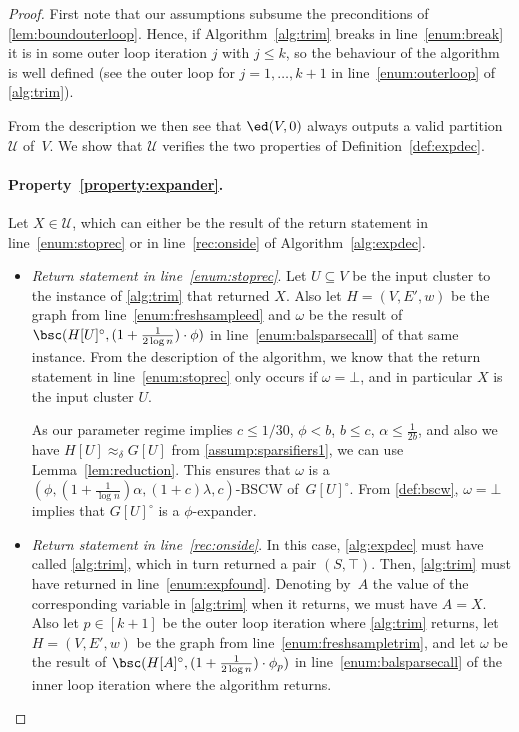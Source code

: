 \begin{proof}
	First note that our assumptions subsume the preconditions of \cref{lem:boundouterloop}. Hence, if Algorithm~\ref{alg:trim} breaks in line~\eqref{enum:break} it is in some outer loop iteration $j$ with $j \le k$, so the behaviour of the algorithm is well defined (see the outer loop for $j=1,\dots,k+1$ in line~\eqref{enum:outerloop} of \cref{alg:trim}).
	
	From the description we then see that $\ed(V,0)$ always outputs a valid partition $\mathcal{U}$ of~$V$. We show that $\mathcal{U}$ verifies the two properties of Definition~\ref{def:expdec}.
	
	\paragraph{Property~\eqref{property:expander}.} Let $X \in \mathcal{U}$, which can either be the result of the return statement in line~\eqref{enum:stoprec} or in line~\eqref{rec:onside} of Algorithm~\ref{alg:expdec}.
	\begin{itemize}
		\item \emph{Return statement in line~\eqref{enum:stoprec}}. Let $U \subseteq V$ be the input cluster to the  instance of \cref{alg:trim} that returned $X$. Also let $H=(V,E',w)$ be the graph from line~\eqref{enum:freshsampleed} and $\omega$ be the result of $\bsc(H[U]^\circ, (1+\frac{1}{2 \log n}) \cdot \phi)$ in line~\eqref{enum:balsparsecall} of that same instance. From the description of the algorithm, we know that the return statement in line~\eqref{enum:stoprec} only occurs if $\omega=\bot$, and in particular $X$ is the input cluster $U$.
		
		As our parameter regime implies $c \le 1/30$, $\phi < b$, $b \le c$, $\alpha \le \frac{1}{2b}$, and also we have $H[U] \approx_\delta G[U]$ from  \cref{assump:sparsifiers1}, we can use Lemma~\ref{lem:reduction}. This ensures that $\omega$ is a $(\phi,(1+\frac{1}{\log n})\alpha,(1+c)\lambda,c)$-BSCW of~$G[U]^\circ$. From \cref{def:bscw}, $\omega=\bot$ implies that $G[U]^\circ$ is a $\phi$-expander.
		
		\item \emph{Return statement in line~\eqref{rec:onside}}.  In this case, \cref{alg:expdec} must have called \cref{alg:trim}, which in turn returned a pair $(S,\top)$. Then, \cref{alg:trim} must have returned in line~\eqref{enum:expfound}. Denoting by~$A$ the value of the corresponding variable in \cref{alg:trim} when it returns, we must have $A=X$. Also let  $p \in [k+1]$ be the outer loop iteration where \cref{alg:trim} returns, let $H=(V,E',w)$ be the graph from line~\eqref{enum:freshsampletrim}, and let $\omega$ be the result of $\bsc(H[A]^\circ, (1+\frac{1}{2 \log n}) \cdot \phi_p)$ in line~\eqref{enum:balsparsecall} of the inner loop iteration where the algorithm returns.
		

\end{itemize}
\end{proof}
